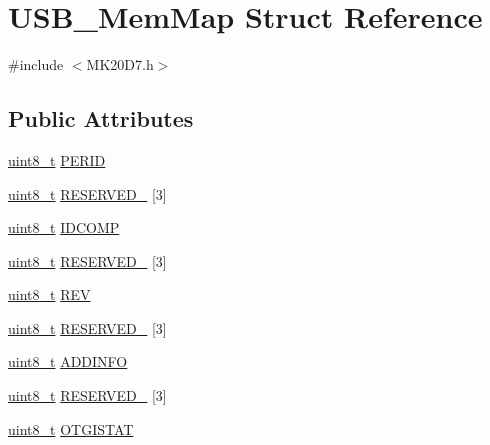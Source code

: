 \hypertarget{struct_u_s_b___mem_map}{}\section{U\+S\+B\+\_\+\+Mem\+Map Struct Reference}
\label{struct_u_s_b___mem_map}


{\ttfamily \#include $<$M\+K20\+D7.\+h$>$}

\subsection*{Public Attributes}
\begin{DoxyCompactItemize}
\item 
\hyperlink{_p_e___types_8h_aba7bc1797add20fe3efdf37ced1182c5}{uint8\+\_\+t} \hyperlink{struct_u_s_b___mem_map_aa3644755d5a3d7b9a8c01055452ebe39}{P\+E\+R\+ID}
\item 
\hyperlink{_p_e___types_8h_aba7bc1797add20fe3efdf37ced1182c5}{uint8\+\_\+t} \hyperlink{struct_u_s_b___mem_map_ae515c02ab9f75ff7003ca2bba944c139}{R\+E\+S\+E\+R\+V\+E\+D\+\_} \mbox{[}3\mbox{]}
\item 
\hyperlink{_p_e___types_8h_aba7bc1797add20fe3efdf37ced1182c5}{uint8\+\_\+t} \hyperlink{struct_u_s_b___mem_map_a87d65236c6baf792a723600b0623eca5}{I\+D\+C\+O\+MP}
\item 
\hyperlink{_p_e___types_8h_aba7bc1797add20fe3efdf37ced1182c5}{uint8\+\_\+t} \hyperlink{struct_u_s_b___mem_map_a75cd27368d69b8bece9c35a15d3e4689}{R\+E\+S\+E\+R\+V\+E\+D\+\_} \mbox{[}3\mbox{]}
\item 
\hyperlink{_p_e___types_8h_aba7bc1797add20fe3efdf37ced1182c5}{uint8\+\_\+t} \hyperlink{struct_u_s_b___mem_map_ac918187248616aac7e5223124ea9610d}{R\+EV}
\item 
\hyperlink{_p_e___types_8h_aba7bc1797add20fe3efdf37ced1182c5}{uint8\+\_\+t} \hyperlink{struct_u_s_b___mem_map_a3a6a0159356d406e655f5d87bee0104f}{R\+E\+S\+E\+R\+V\+E\+D\+\_} \mbox{[}3\mbox{]}
\item 
\hyperlink{_p_e___types_8h_aba7bc1797add20fe3efdf37ced1182c5}{uint8\+\_\+t} \hyperlink{struct_u_s_b___mem_map_aa87a73875ff45abb9b84992687f48000}{A\+D\+D\+I\+N\+FO}
\item 
\hyperlink{_p_e___types_8h_aba7bc1797add20fe3efdf37ced1182c5}{uint8\+\_\+t} \hyperlink{struct_u_s_b___mem_map_af951af4bc5803013550edededdced056}{R\+E\+S\+E\+R\+V\+E\+D\+\_} \mbox{[}3\mbox{]}
\item 
\hyperlink{_p_e___types_8h_aba7bc1797add20fe3efdf37ced1182c5}{uint8\+\_\+t} \hyperlink{struct_u_s_b___mem_map_a6eacb73f23f815f7686f4e7bf7eb2fcc}{O\+T\+G\+I\+S\+T\+AT}

\end{DoxyCompactItemize}
